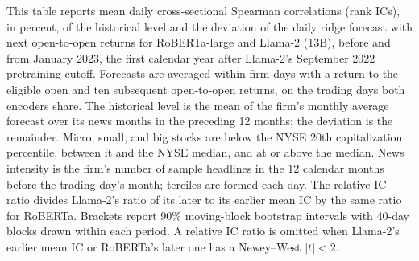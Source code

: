 \begin{table}[htbp]
\centering
\caption{Rank ICs across the Llama-2 Pretraining Cutoff by Firm Size and News Intensity}
\label{tab:tab11}
\begin{minipage}{\linewidth}\footnotesize
This table reports mean daily cross-sectional Spearman correlations (rank ICs), in percent, of the historical level and the deviation of the daily ridge forecast with next open-to-open returns for RoBERTa-large and Llama-2 (13B), before and from January 2023, the first calendar year after Llama-2's September 2022 pretraining cutoff. Forecasts are averaged within firm-days with a return to the eligible open and ten subsequent open-to-open returns, on the trading days both encoders share. The historical level is the mean of the firm's monthly average forecast over its news months in the preceding 12 months; the deviation is the remainder. Micro, small, and big stocks are below the NYSE 20th capitalization percentile, between it and the NYSE median, and at or above the median. News intensity is the firm's number of sample headlines in the 12 calendar months before the trading day's month; terciles are formed each day. The relative IC ratio divides Llama-2's ratio of its later to its earlier mean IC by the same ratio for RoBERTa. Brackets report 90\% moving-block bootstrap intervals with 40-day blocks drawn within each period. A relative IC ratio is omitted when Llama-2's earlier mean IC or RoBERTa's later one has a Newey--West $|t|<2$.
\end{minipage}
\medskip


\end{table}
